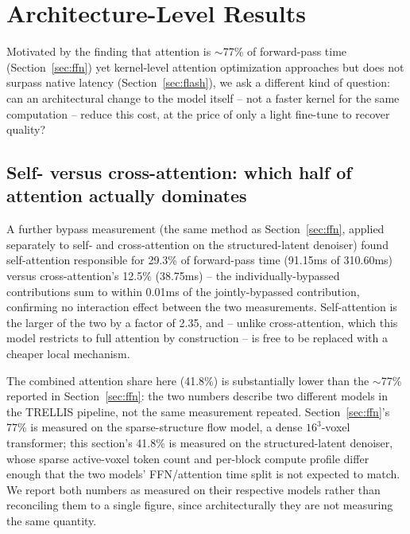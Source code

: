 \documentclass[11pt]{article}
\begin{document}
\section{Architecture-Level Results}
\label{sec:architecture}

Motivated by the finding that attention is $\sim$77\% of forward-pass time
(Section~\ref{sec:ffn}) yet kernel-level attention optimization approaches but does not surpass
native latency (Section~\ref{sec:flash}), we ask a different kind of question: can an
architectural change to the model itself -- not a faster kernel for the same computation --
reduce this cost, at the price of only a light fine-tune to recover quality?

\subsection{Self- versus cross-attention: which half of attention actually dominates}
A further bypass measurement (the same method as Section~\ref{sec:ffn}, applied separately to
self- and cross-attention on the structured-latent denoiser) found self-attention responsible for
29.3\% of forward-pass time (91.15ms of 310.60ms) versus cross-attention's 12.5\% (38.75ms) --
the individually-bypassed contributions sum to within 0.01ms of the jointly-bypassed contribution,
confirming no interaction effect between the two measurements. Self-attention is the larger of the
two by a factor of 2.35, and -- unlike cross-attention, which this model restricts to full
attention by construction -- is free to be replaced with a cheaper local mechanism.

The combined attention share here (41.8\%) is substantially lower than the $\sim$77\% reported in
Section~\ref{sec:ffn}: the two numbers describe two different models in the TRELLIS pipeline, not
the same measurement repeated. Section~\ref{sec:ffn}'s 77\% is measured on the sparse-structure
flow model, a dense $16^3$-voxel transformer; this section's 41.8\% is measured on the
structured-latent denoiser, whose sparse active-voxel token count and per-block compute profile
differ enough that the two models' FFN/attention time split is not expected to match. We report
both numbers as measured on their respective models rather than reconciling them to a single
figure, since architecturally they are not measuring the same quantity.
\end{document}
